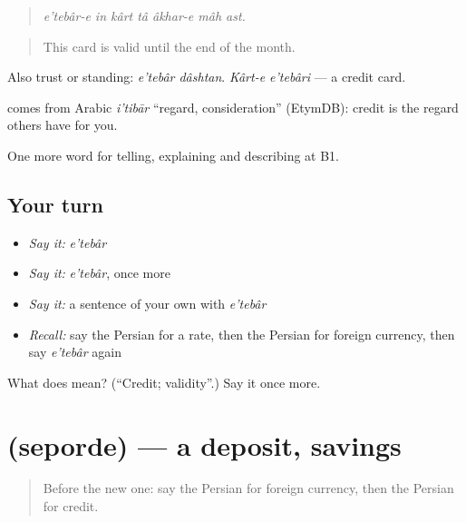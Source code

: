 \begin{quote}
\emph{e'tebâr-e in kârt tâ âkhar-e mâh ast.}
\end{quote}

\begin{quote}
This card is valid until the end of the month.
\end{quote}

Also trust or standing: \emph{e'tebâr dâshtan}. \emph{Kârt-e e'tebâri} — a credit card.

\begin{cousinweb}
\textbf{} comes from Arabic \emph{i'tibār} \textquotedblleft{}regard, consideration\textquotedblright{} (EtymDB): credit is the regard others have for you.
\end{cousinweb}

\begin{grammarlens}[title={What you've built}]
One more word for telling, explaining and describing at B1.
\end{grammarlens}

\subsection*{Your turn}
\begin{itemize}
\raggedright
  \item \emph{Say it:} \emph{e'tebâr}
  \item \emph{Say it:} \emph{e'tebâr}, once more
  \item \emph{Say it:} a sentence of your own with \emph{e'tebâr}
  \item \emph{Recall:} say the Persian for a rate, then the Persian for foreign currency, then say \emph{e'tebâr} again
\end{itemize}

\begin{tcolorbox}[breakable,colback=teal!4,colframe=teal!35!black,title={Before you move on}]
What does  mean? (\textquotedblleft{}Credit; validity\textquotedblright{}.) Say it once more.
\end{tcolorbox}
\section[\texorpdfstring{\fa{سپرده} (seporde)}{سپرده (seporde)}]{ (seporde) — a deposit, savings}

\label{lesson:FA-C414-seporde}



\begin{quote}
Before the new one: say the Persian for foreign currency, then the Persian for credit.
\end{quote}

